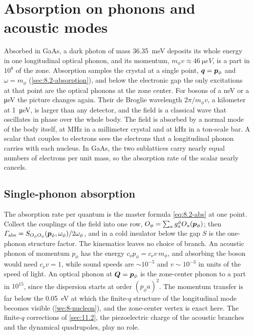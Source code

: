 \section{Absorption on phonons and acoustic modes}\label{sec:11.8}

Absorbed in GaAs, a dark photon of mass \SI{36.35}{meV} deposits its whole energy in one longitudinal optical phonon, and its momentum, $m_\phi v \approx \SI{46}{\micro eV}$, is a part in $10^{8}$ of the zone. Absorption samples the crystal at a single point, $\bm{q} = \bm{p}_\phi$ and $\omega = m_\phi$ (\cref{sec:8.2-absorption}), and below the electronic gap the only excitations at that point are the optical phonons at the zone center. For bosons of a neV or a \si{\micro eV} the picture changes again. Their de Broglie wavelength $2\pi/m_\phi v$, a kilometer at \SI{1}{\micro eV}, is larger than any detector, and the field is a classical wave that oscillates in phase over the whole body. The field is absorbed by a normal mode of the body itself, at MHz in a millimeter crystal and at kHz in a ton-scale bar. A scalar that couples to electrons sees the electrons that a longitudinal phonon carries with each nucleus. In GaAs, the two sublattices carry nearly equal numbers of electrons per unit mass, so the absorption rate of the scalar nearly cancels.

\subsection{Single-phonon absorption}\label{sec:11.8-single}

The absorption rate per quantum is the master formula \cref{eq:8.2-abs} at one point. Collect the couplings of the field into one row, $O_\phi = \sum_ag^\phi_aO_a(\bm{p}_\phi)$; then $\varGamma_{\mathrm{abs}} = S_{O_\phi O_\phi}(\bm{p}_\phi,\omega_\phi)/2\omega_\phi$, and in a cold insulator below the gap $S$ is the one-phonon structure factor. The kinematics leaves no choice of branch. An acoustic phonon of momentum $p_\phi$ has the energy $c_\nu p_\phi = c_\nu v\,m_\phi$, and absorbing the boson would need $c_\nu v = 1$, while sound speeds are $\sim 10^{-5}$ and $v \sim 10^{-3}$ in units of the speed of light. An optical phonon at $\bm{Q} = \bm{p}_\phi$ is the zone-center phonon to a part in $10^{15}$, since the dispersion starts at order $(p_\phi a)^2$. The momentum transfer is far below the \SI{0.05}{eV} at which the finite-$q$ structure of the longitudinal mode becomes visible (\cref{we:8-nucleon}), and the zone-center vertex is exact here. The finite-$q$ corrections of \cref{sec:11.2}, the piezoelectric charge of the acoustic branches and the dynamical quadrupoles, play no role.

